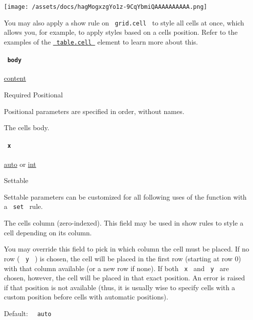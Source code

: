 \texttt{[image: /assets/docs/hagMogxzgYo1z-9CqYbmiQAAAAAAAAAA.png]}

You may also apply a show rule on \texttt{\ grid.cell\ } to style all
cells at once, which allows you, for example, to apply styles based on a
cell\textquotesingle s position. Refer to the examples of the
\href{/docs/reference/model/table/\#definitions-cell}{\texttt{\ table.cell\ }}
element to learn more about this.

\paragraph{\texorpdfstring{\texttt{\ body\ }}{ body }}\label{definitions-cell-body}

\href{/docs/reference/foundations/content/}{content}

{Required} {{ Positional }}

\label{definitions-cell-body-positional-tooltip}
Positional parameters are specified in order, without names.

The cell\textquotesingle s body.

\paragraph{\texorpdfstring{\texttt{\ x\ }}{ x }}\label{definitions-cell-x}

\href{/docs/reference/foundations/auto/}{auto} {or}
\href{/docs/reference/foundations/int/}{int}

{{ Settable }}

\label{definitions-cell-x-settable-tooltip}
Settable parameters can be customized for all following uses of the
function with a \texttt{\ set\ } rule.

The cell\textquotesingle s column (zero-indexed). This field may be used
in show rules to style a cell depending on its column.

You may override this field to pick in which column the cell must be
placed. If no row ( \texttt{\ y\ } ) is chosen, the cell will be placed
in the first row (starting at row 0) with that column available (or a
new row if none). If both \texttt{\ x\ } and \texttt{\ y\ } are chosen,
however, the cell will be placed in that exact position. An error is
raised if that position is not available (thus, it is usually wise to
specify cells with a custom position before cells with automatic
positions).

Default: \texttt{\ }{\texttt{\ auto\ }}\texttt{\ }

